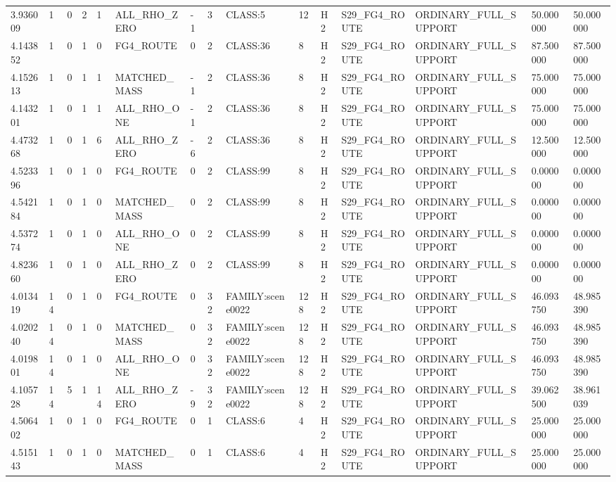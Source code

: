 \begin{tabular}{lllllllllllllll}
3.936009 & 1 & 0 & 2 & 1 & ALL\_RHO\_ZERO & -1 & 3 & CLASS:5 & 12 & H2 & S29\_FG4\_ROUTE & ORDINARY\_FULL\_SUPPORT & 50.000000 & 50.000000 \\
4.143852 & 1 & 0 & 1 & 0 & FG4\_ROUTE & 0 & 2 & CLASS:36 & 8 & H2 & S29\_FG4\_ROUTE & ORDINARY\_FULL\_SUPPORT & 87.500000 & 87.500000 \\
4.152613 & 1 & 0 & 1 & 1 & MATCHED\_MASS & -1 & 2 & CLASS:36 & 8 & H2 & S29\_FG4\_ROUTE & ORDINARY\_FULL\_SUPPORT & 75.000000 & 75.000000 \\
4.143201 & 1 & 0 & 1 & 1 & ALL\_RHO\_ONE & -1 & 2 & CLASS:36 & 8 & H2 & S29\_FG4\_ROUTE & ORDINARY\_FULL\_SUPPORT & 75.000000 & 75.000000 \\
4.473268 & 1 & 0 & 1 & 6 & ALL\_RHO\_ZERO & -6 & 2 & CLASS:36 & 8 & H2 & S29\_FG4\_ROUTE & ORDINARY\_FULL\_SUPPORT & 12.500000 & 12.500000 \\
4.523396 & 1 & 0 & 1 & 0 & FG4\_ROUTE & 0 & 2 & CLASS:99 & 8 & H2 & S29\_FG4\_ROUTE & ORDINARY\_FULL\_SUPPORT & 0.000000 & 0.000000 \\
4.542184 & 1 & 0 & 1 & 0 & MATCHED\_MASS & 0 & 2 & CLASS:99 & 8 & H2 & S29\_FG4\_ROUTE & ORDINARY\_FULL\_SUPPORT & 0.000000 & 0.000000 \\
4.537274 & 1 & 0 & 1 & 0 & ALL\_RHO\_ONE & 0 & 2 & CLASS:99 & 8 & H2 & S29\_FG4\_ROUTE & ORDINARY\_FULL\_SUPPORT & 0.000000 & 0.000000 \\
4.823660 & 1 & 0 & 1 & 0 & ALL\_RHO\_ZERO & 0 & 2 & CLASS:99 & 8 & H2 & S29\_FG4\_ROUTE & ORDINARY\_FULL\_SUPPORT & 0.000000 & 0.000000 \\
4.013419 & 14 & 0 & 1 & 0 & FG4\_ROUTE & 0 & 32 & FAMILY:scene0022 & 128 & H2 & S29\_FG4\_ROUTE & ORDINARY\_FULL\_SUPPORT & 46.093750 & 48.985390 \\
4.020240 & 14 & 0 & 1 & 0 & MATCHED\_MASS & 0 & 32 & FAMILY:scene0022 & 128 & H2 & S29\_FG4\_ROUTE & ORDINARY\_FULL\_SUPPORT & 46.093750 & 48.985390 \\
4.019801 & 14 & 0 & 1 & 0 & ALL\_RHO\_ONE & 0 & 32 & FAMILY:scene0022 & 128 & H2 & S29\_FG4\_ROUTE & ORDINARY\_FULL\_SUPPORT & 46.093750 & 48.985390 \\
4.105728 & 14 & 5 & 1 & 14 & ALL\_RHO\_ZERO & -9 & 32 & FAMILY:scene0022 & 128 & H2 & S29\_FG4\_ROUTE & ORDINARY\_FULL\_SUPPORT & 39.062500 & 38.961039 \\
4.506402 & 1 & 0 & 1 & 0 & FG4\_ROUTE & 0 & 1 & CLASS:6 & 4 & H2 & S29\_FG4\_ROUTE & ORDINARY\_FULL\_SUPPORT & 25.000000 & 25.000000 \\
4.515143 & 1 & 0 & 1 & 0 & MATCHED\_MASS & 0 & 1 & CLASS:6 & 4 & H2 & S29\_FG4\_ROUTE & ORDINARY\_FULL\_SUPPORT & 25.000000 & 25.000000 \\

\end{tabular}
